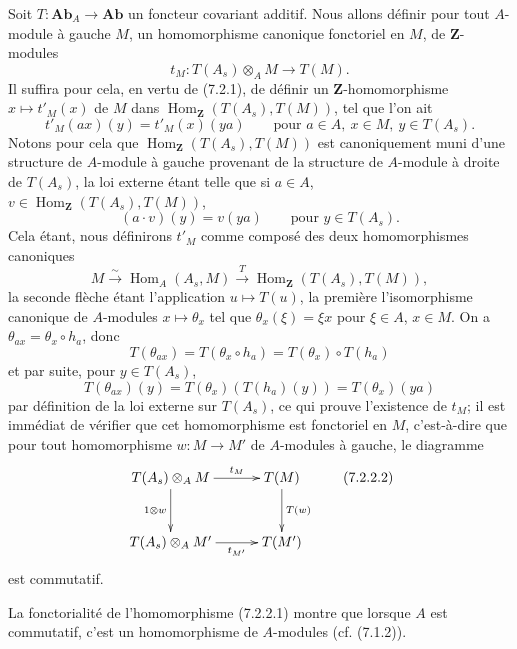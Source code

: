 \begin{env}[7.2.2]
Soit $T:\mathbf{Ab}_A\to\mathbf{Ab}$ un foncteur covariant additif. Nous
allons définir pour tout $A$-module à gauche $M$, un homomorphisme canonique
fonctoriel en $M$, de $\mathbf Z$-modules
\[
  t_M:T(A_s)\otimes_A M\longrightarrow T(M).
  \tag{7.2.2.1}\label{III.7.2.2.1.fr}
\]
Il suffira pour cela, en vertu de (7.2.1), de définir un
$\mathbf Z$-homomorphisme $x\mapsto t'_M(x)$ de $M$ dans
$\operatorname{Hom}_{\mathbf Z}(T(A_s),T(M))$, tel que l'on ait
\[
  t'_M(ax)(y)=t'_M(x)(ya)
  \qquad\text{pour }a\in A,\ x\in M,\ y\in T(A_s).
\]
Notons pour cela que
$\operatorname{Hom}_{\mathbf Z}(T(A_s),T(M))$ est canoniquement muni d'une
structure de $A$-module à gauche provenant de la structure de $A$-module à
droite de $T(A_s)$, la loi externe étant telle que si
$a\in A$, $v\in\operatorname{Hom}_{\mathbf Z}(T(A_s),T(M))$,
\[
  (a\cdot v)(y)=v(ya)
  \qquad\text{pour }y\in T(A_s).
\]
Cela étant, nous définirons $t'_M$ comme composé des deux homomorphismes
canoniques
\[
  M\xrightarrow{\sim}\operatorname{Hom}_A(A_s,M)
  \xrightarrow{T}
  \operatorname{Hom}_{\mathbf Z}(T(A_s),T(M)),
\]
la seconde flèche étant l'application $u\mapsto T(u)$, la première
l'isomorphisme canonique de $A$-modules $x\mapsto\theta_x$ tel que
$\theta_x(\xi)=\xi x$ pour $\xi\in A$, $x\in M$. On a
$\theta_{ax}=\theta_x\circ h_a$, donc
\[
  T(\theta_{ax})
  =
  T(\theta_x\circ h_a)
  =
  T(\theta_x)\circ T(h_a)
\]
et par suite, pour $y\in T(A_s)$,
\[
  T(\theta_{ax})(y)
  =
  T(\theta_x)(T(h_a)(y))
  =
  T(\theta_x)(ya)
\]
par définition de la loi externe sur $T(A_s)$, ce qui prouve l'existence de
$t_M$; il est immédiat de vérifier que cet homomorphisme est fonctoriel en
$M$, c'est-à-dire que pour tout homomorphisme $w:M\to M'$ de $A$-modules à
gauche, le diagramme
\[
\xymatrix@C=30pt@R=30pt{
  T(A_s)\otimes_A M
  \ar[r]^-{t_M}\ar[d]_{1\otimes w}
  &
  T(M)\ar[d]^{T(w)}
  \\
  T(A_s)\otimes_A M'
  \ar[r]_-{t_{M'}}
  &
  T(M')
}
\tag{7.2.2.2}\label{III.7.2.2.2.fr}
\]
est commutatif.

La fonctorialité de l'homomorphisme (7.2.2.1) montre que lorsque $A$ est
commutatif, c'est un homomorphisme de $A$-modules (cf. (7.1.2)).
\end{env}

